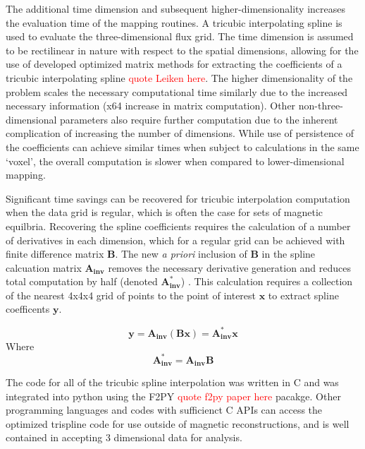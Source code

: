 \documentclass[12pt,floatfix,showpacs]{revtex4-1}
\newcommand{\note}[1]{\textcolor{red}{#1}}
\begin{document}
The additional time dimension and subsequent higher-dimensionality increases the evaluation time of the mapping routines. A tricubic interpolating spline is used to evaluate the three-dimensional flux grid. The time dimension is assumed to be rectilinear in nature with respect to the spatial dimensions, allowing for the use of developed optimized matrix methods for extracting the coefficients of a tricubic interpolating spline \note{quote Leiken here}. The higher dimensionality of the problem scales the necessary computational time similarly due to the increased necessary information (x64 increase in matrix computation). Other non-three-dimensional parameters also require further computation due to the inherent complication of increasing the number of dimensions. While use of persistence of the coefficients can achieve similar times when subject to calculations in the same `voxel', the overall computation is slower when compared to lower-dimensional mapping.

Significant time savings can be recovered for tricubic interpolation computation when the data grid is regular, which is often the case for sets of magnetic equilbria. Recovering the spline coefficients requires the calculation of a number of derivatives in each dimension, which for a regular grid can be achieved with finite difference matrix $\boldsymbol{B}$. The new \emph{a priori} inclusion of $\boldsymbol{B}$ in the spline calcuation matrix $\boldsymbol{A_{inv}}$ removes the necessary derivative generation and reduces total computation by half (denoted 
$\boldsymbol{A_{inv}^*}$) . This calculation requires a collection of the nearest 4x4x4 grid of points to the point of interest $\boldsymbol{x}$ to extract spline coefficents $\boldsymbol{y}$.

\begin{equation}
\boldsymbol{y} = \boldsymbol{A_{inv}} ( \boldsymbol{B} \boldsymbol{x}) = \boldsymbol{A_{inv}^*}\boldsymbol{x}
\end{equation}
Where
\begin{equation}
\boldsymbol{A_{inv}^*} = \boldsymbol{A_{inv}}\boldsymbol{B} 
\end{equation}

The code for all of the tricubic spline interpolation was written in C and was integrated into python using the F2PY \note{quote f2py paper here} pacakge. Other programming languages and codes with sufficienct C APIs can access the optimized trispline code for use outside of magnetic reconstructions, and is well contained in accepting 3 dimensional data for analysis.
\end{document}
